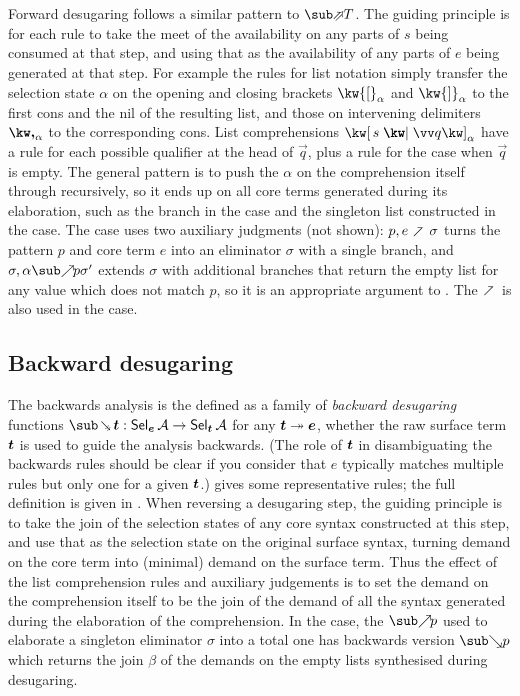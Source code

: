 Forward desugaring follows a similar pattern to $\evalFwdF{T}$. The guiding principle is for each rule to take the meet of the availability on any parts of $s$ being consumed at that step, and using that as the availability of any parts of $e$ being generated at that step. For example the rules for list notation simply transfer the selection state $\alpha$ on the opening and closing brackets $\annot{\kw{[}}{\alpha}$ and $\annot{\kw{]}}{\alpha}$ to the first cons and the nil of the resulting list, and those on intervening delimiters $\annot{\comma}{\alpha}$ to the corresponding cons. List comprehensions $\annListComp{s}{\vec{q}}{\alpha}$ have a rule for each possible qualifier at the head of $\vec{q}$, plus a rule for the case when $\vec{q}$ is empty. The general pattern is to push the $\alpha$ on the comprehension itself through recursively, so it ends up on all core terms generated during its elaboration, such as the  branch in the  case and the singleton list constructed in the  case. The  case uses two auxiliary judgments (not shown): $p, e \clauseFwdR \sigma$ turns the pattern $p$ and core term $e$ into an eliminator $\sigma$ with a single branch, and $\totaliseFwd{\sigma}{\alpha}{p}{\sigma'}$ extends $\sigma$ with additional branches that return the empty list for any value which does not match $p$, so it is an appropriate argument to . The $\clauseFwdR$ is also used in the  case.

\subsection{Backward desugaring}

The backwards analysis is the defined as a family of \textit{backward desugaring} functions $\desugarBwdR{\raw{t}}: \Sel{\raw{e}}{A} \to \Sel{\raw{t}}{A}$ for any $\bm{t} \twoheadrightarrow \bm{e}$, whether the raw surface term $\bm{t}$ is used to guide the analysis backwards. (The role of $\bm{t}$ in disambiguating the backwards rules should be clear if you consider that $e$ typically matches multiple rules but only one for a given $\bm{t}$.)  gives some representative rules; the full definition is {\ifappendices given in  \else \IncludedWithSupplementaryMaterial.\fi} When reversing a desugaring step, the guiding principle is to take the join of the selection states of any core syntax constructed at this step, and use that as the selection state on the original surface syntax, turning demand on the core term into (minimal) demand on the surface term. Thus the effect of the list comprehension rules and auxiliary judgements is to set the demand on the comprehension itself to be the join of the demand of all the syntax generated during the elaboration of the comprehension. In the  case, the $\totaliseFwdR{p}$ used to elaborate a singleton eliminator $\sigma$ into a total one has backwards version $\totaliseBwdR{p}$ which returns the join $\beta$ of the demands on the empty lists synthesised during desugaring.


